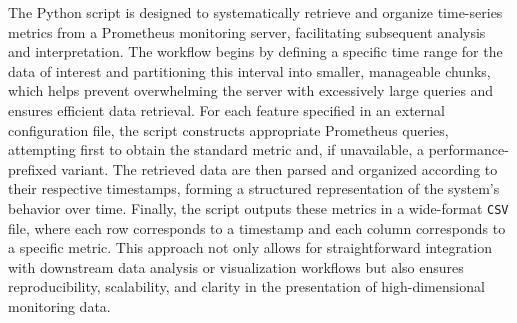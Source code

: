 The Python script is designed to systematically retrieve and organize time-series metrics from a Prometheus monitoring server, facilitating subsequent analysis and interpretation. The workflow begins by defining a specific time range for the data of interest and partitioning this interval into smaller, manageable chunks, which helps prevent overwhelming the server with excessively large queries and ensures efficient data retrieval. For each feature specified in an external configuration file, the script constructs appropriate Prometheus queries, attempting first to obtain the standard metric and, if unavailable, a performance-prefixed variant. The retrieved data are then parsed and organized according to their respective timestamps, forming a structured representation of the system's behavior over time. Finally, the script outputs these metrics in a wide-format \texttt{CSV} file, where each row corresponds to a timestamp and each column corresponds to a specific metric. This approach not only allows for straightforward integration with downstream data analysis or visualization workflows but also ensures reproducibility, scalability, and clarity in the presentation of high-dimensional monitoring data.
